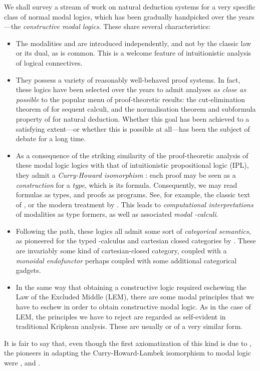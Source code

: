 \documentclass[a4paper]{amsart}
\begin{document}
We shall survey a stream of work on natural deduction systems for
a very specific class of normal modal logics, which has been
gradually handpicked over the years---the \emph{constructive modal
logics}. These share several characteristics: \begin{itemize}
  \item The modalities  and  are introduced
  independently, and not by the classic law  or its dual, as is common.  This is a
  welcome feature of intuitionistic analysis of logical
  connectives.

  \item They possess a variety of reasonably well-behaved proof
  systems. In fact, these logics have been selected over the years
  to admit analyses \emph{as close as possible} to the popular
  menu of proof-theoretic results: the cut-elimination theorem of
  \cite{Gentzen1935a, Gentzen1935b} for sequent calculi, and the
  normalisation theorem and subformula property of
  \cite{Prawitz1965} for natural deduction. Whether this goal has
  been achieved to a satisfying extent---or whether this is
  possible at all---has been the subject of debate for a long
  time.

  \item As a consequence of the striking similarity of the
  proof-theoretic analysis of these modal logic logics with that of
  intuitionistic propositional logic (\textsf{IPL}), they
  admit a \emph{Curry-Howard isomorphism} \citep{Curry1958,
  Howard1980}: each proof may be seen as a \emph{construction} for
  a \emph{type}, which is its formula. Consequently, we may read
  formulas as types, and proofs as programs. See, for example, the
  classic text of \cite{Girard1989}, or the modern treatment by
  \cite{Sorensen2006}. This leads to \emph{computational
  interpretations} of modalities as type formers, as well as
  associated \emph{modal -calculi}.

  \item Following the path, these logics all admit some sort of
  \emph{categorical semantics}, as pioneered for the typed
  -calculus and cartesian closed categories by
  \cite{Lambek1980}. These are invariably some kind of
  cartesian-closed category, coupled with a \emph{monoidal
  endofunctor} perhaps coupled with some additional categorical
  gadgets.

  \item In the same way that obtaining a constructive logic
  required eschewing the Law of the Excluded Middle
  (\textsf{LEM}), there are some modal principles that we have to
  eschew in order to obtain constructive modal
  logic. As in the case of \textsf{LEM}, the principles we have to
  reject are regarded as self-evident in traditional Kripkean
  analysis. These are usually  or of a very similar form.
\end{itemize} It is fair to say that, even though the first
axiomatization of this kind is due to \cite{Wijesekera1990}, the
pioneers in adapting the Curry-Howard-Lambek isomorphism to modal
logic were \cite{Bierman1992a, Bierman1996a,
Bierman2000a}, and \cite{Moggi1989, Moggi1991}.
\end{document}
